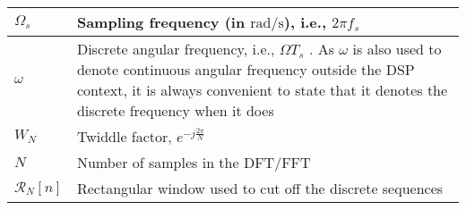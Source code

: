 \begin{xltabular}{\textwidth}{XX}
	\(\Omega_s\)                                                                                          & Sampling frequency (in \(\si{\radian\per\second}\)), i.e., \(2\pi f_s\)                                                                                                                                                                                                                                                                                                                                                                                  \\ \hline
	\(\omega\)                                                                                            & Discrete angular frequency, i.e., \(\Omega T_s\) \cite[eq (3.27)]{ingleDigitalSignalProcessing2000}. As \(\omega\) is also used to denote continuous angular frequency outside the DSP context, it is always convenient to state that it denotes the discrete frequency when it does                                                                                                                                                                     \\ \hline
	\(W_N\)                                                                                               & Twiddle factor, \(e^{-j\frac{2\pi}{N}}\) \cite{ingleDigitalSignalProcessing2000}                                                                                                                                                                                                                                                                                                                                                                         \\ \hline
	\(N\)                                                                                                 & Number of samples in the DFT/FFT                                                                                                                                                                                                                                                                                                                                                                                                                         \\ \hline
	\(\mathcal{R}_N [n]\)                                                                                 & Rectangular window used to cut off the discrete sequences \cite{ingleDigitalSignalProcessing2000}                                                                                                                                                                                                                                                                                                                                                        \\ \hline

\end{xltabular}
